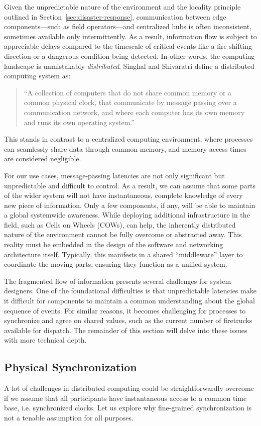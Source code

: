 \documentclass[]             %
{NASA}                       %
\theoremstyle{definition}
\begin{document}
Given the unpredictable nature of the environment and the locality
principle outlined in Section~\ref{sec:disaster-response},
communication between edge components---such as field operators---and
centralized hubs is often inconsistent, sometimes available only
intermittently. As a result, information flow is subject to
appreciable delays compared to the timescale of critical events like a
fire shifting direction or a dangerous condition being detected. In
other words, the computing landscape is unmistakably
\emph{distributed}. Singhal and Shivaratri \cite{10.5555/562065}
define a distributed computing system as:
\begin{quote}
  ``A collection of computers that do not share common
  memory or a common physical clock, that communicate by message
  passing over a communication network, and where each computer has
  its own memory and runs its own operating system.''
\end{quote}
This stands in contrast to a centralized computing environment, where
processes can seamlessly share data through common memory, and memory
access times are considered negligible.

For our use cases, message-passing latencies are not only significant
but unpredictable and difficult to control. As a result, we can
assume that some parts of the wider system will not have
instantaneous, complete knowledge of every new piece of
information. Only a few components, if any, will be able to maintain a
global systemwide awareness. While deploying additional infrastructure
in the field, such as Cells on Wheels (COWs), can help, the inherently
distributed nature of the environment cannot be fully overcome or
abstracted away. This reality must be embedded in the design of the
software and networking architecture itself. Typically, this manifests
in a shared ``middleware'' layer to coordinate the moving parts,
ensuring they function as a unified system.

The fragmented flow of information presents several challenges for
system designers. One of the foundational difficulties is that
unpredictable latencies make it difficult for components to maintain a
common understanding about the global sequence of events. For similar
reasons, it becomes challenging for processes to synchronize and agree
on shared values, such as the current number of firetrucks available
for dispatch. The remainder of this section will delve into these
issues with more technical depth.

\subsection{Physical Synchronization}
\label{ssec:physical-synchronization}
A lot of challenges in distributed computing could be
straightforwardly overcome if we assume that all participants have
instantaneous access to a common time base, i.e.  synchronized
clocks. Let us explore why fine-grained synchronization is not a
tenable assumption for all purposes.
\end{document}
